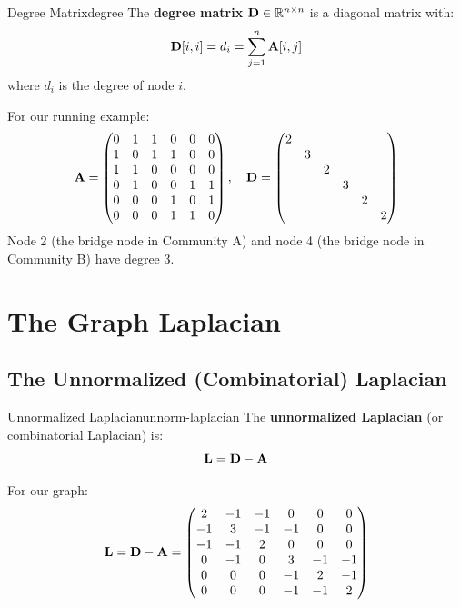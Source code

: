 \begin{notechapter}
\begin{definition}{Degree Matrix}{degree}
The \textbf{degree matrix} $\mathbf{D} \in \mathbb{R}^{n \times n}$ is a diagonal matrix with:
\[
\mathbf{D}[i,i] = d_i = \sum_{j=1}^{n} \mathbf{A}[i,j]
\]
where $d_i$ is the degree of node $i$.
\end{definition}

\begin{example}
For our running example:
\[
\mathbf{A} = \begin{pmatrix}
0 & 1 & 1 & 0 & 0 & 0 \\
1 & 0 & 1 & 1 & 0 & 0 \\
1 & 1 & 0 & 0 & 0 & 0 \\
0 & 1 & 0 & 0 & 1 & 1 \\
0 & 0 & 0 & 1 & 0 & 1 \\
0 & 0 & 0 & 1 & 1 & 0
\end{pmatrix}, \quad
\mathbf{D} = \begin{pmatrix}
2 & & & & & \\
& 3 & & & & \\
& & 2 & & & \\
& & & 3 & & \\
& & & & 2 & \\
& & & & & 2
\end{pmatrix}
\]
Node 2 (the bridge node in Community A) and node 4 (the bridge node in Community B) have degree 3.
\end{example}

\section{The Graph Laplacian}

\subsection{The Unnormalized (Combinatorial) Laplacian}

\begin{definition}{Unnormalized Laplacian}{unnorm-laplacian}
The \textbf{unnormalized Laplacian} (or combinatorial Laplacian) is:
\begin{equation}
\mathbf{L} = \mathbf{D} - \mathbf{A}
\label{graph-laplacians:eq:laplacian}
\end{equation}
\end{definition}

\begin{example}
For our graph:
\[
\mathbf{L} = \mathbf{D} - \mathbf{A} = \begin{pmatrix}
2 & -1 & -1 & 0 & 0 & 0 \\
-1 & 3 & -1 & -1 & 0 & 0 \\
-1 & -1 & 2 & 0 & 0 & 0 \\
0 & -1 & 0 & 3 & -1 & -1 \\
0 & 0 & 0 & -1 & 2 & -1 \\
0 & 0 & 0 & -1 & -1 & 2
\end{pmatrix}
\]


\end{example}
\end{notechapter}
